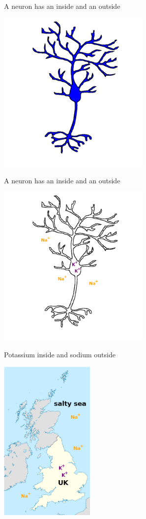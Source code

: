 \documentclass{beamer}
\begin{document}
\begin{frame}{A neuron has an inside and an outside}
  \begin{center}
    \includegraphics[height=8cm]{neuron_filled.png}
  \end{center}
\end{frame}

\begin{frame}{A neuron has an inside and an outside}
  \begin{center}
    \includegraphics[height=8cm]{ions.png}
  \end{center}
\end{frame}

\begin{frame}{Potassium inside and sodium outside}
  \begin{center}
    \includegraphics[height=8cm]{uk.png}
  \end{center}
\end{frame}
\end{document}

